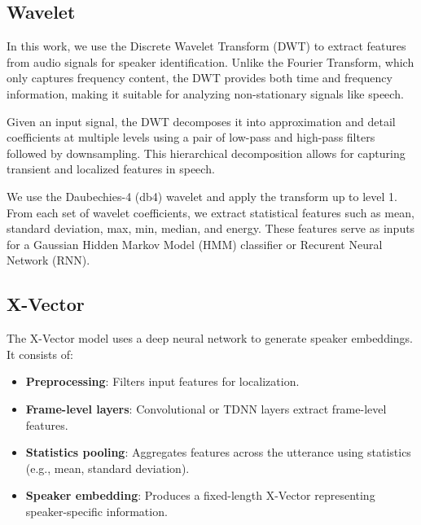 \documentclass[conference]{IEEEtran}
\begin{document}
\subsection{Wavelet}

In this work, we use the Discrete Wavelet Transform (DWT) to extract features
from audio signals for speaker identification. Unlike the Fourier Transform,
which only captures frequency content, the DWT provides both time and frequency information, making it suitable for analyzing non-stationary signals like speech.

Given an input signal, the DWT decomposes it into approximation and detail
coefficients at multiple levels using a pair of low-pass and high-pass filters followed by downsampling. This hierarchical decomposition allows for capturing transient and localized features in speech.

We use the Daubechies-4 (db4) wavelet and apply the transform up to level 1.
From each set of wavelet coefficients, we extract statistical features such as mean, standard deviation, max, min, median, and energy. These features serve as inputs for a Gaussian Hidden Markov Model (HMM) classifier or Recurent Neural Network (RNN). \cite{tufekci2000dwt}















\subsection{X-Vector}

The X-Vector model uses a deep neural network to generate speaker embeddings. It consists of:

\begin{itemize} \item \textbf{Preprocessing}: Filters input features for localization.
    \item \textbf{Frame-level layers}: Convolutional or TDNN layers extract
          frame-level features. \item \textbf{Statistics pooling}: Aggregates
          features across the utterance using statistics (e.g., mean, standard deviation).
    \item \textbf{Speaker embedding}: Produces a fixed-length X-Vector
          representing speaker-specific information. \end{itemize}
\end{document}
